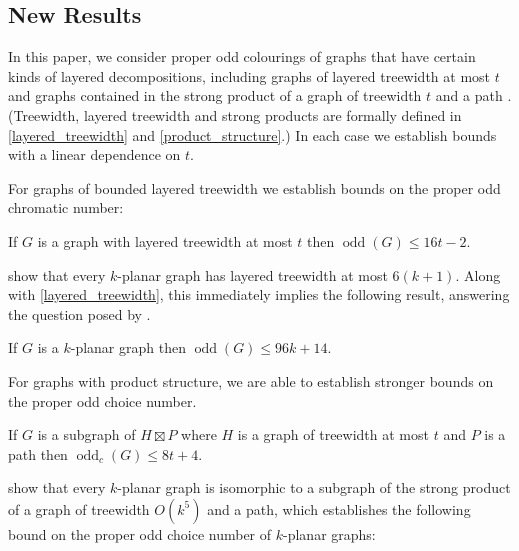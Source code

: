\documentclass{patmorin}
\DeclareMathOperator{\odd}{odd}
\newcommand{\oddc}{\odd_c}
\begin{document}
\subsection{New Results}

In this paper, we consider proper odd colourings of graphs that have certain kinds of layered decompositions, including graphs of layered treewidth at most $t$ \cite{dujmovic.morin.ea:layered} and graphs contained in the strong product of a graph of treewidth $t$ and a path \cite{dujmovic.joret.ea:planar}.  (Treewidth, layered treewidth and strong products are formally defined in \cref{layered_treewidth} and \cref{product_structure}.)  
In each case we establish bounds with a linear dependence on $t$.  

For graphs of bounded layered treewidth we establish bounds on the proper odd chromatic number:

\begin{thm}\label{layered_treewidth_result}
  If $G$ is a graph with layered treewidth at most $t$ then $\odd(G)\le 16t-2$.
\end{thm}

\citet[Theorem 10]{dujmovic.eppstein.ea:genus} show that every $k$-planar graph has layered treewidth at most $6(k+1)$.  Along with \cref{layered_treewidth}, this immediately implies the following result, answering the question posed by \citet{cranston.lafferty.ea:note}.

\begin{cor}\label{k_planar}
  If $G$ is a $k$-planar graph then $\odd(G)\le 96k+14$.
\end{cor}

For graphs with product structure, we are able to establish stronger bounds on the proper odd choice number.

\begin{thm}\label{product_structure_result}
  If $G$ is a subgraph of $H\boxtimes P$ where $H$ is a graph of treewidth at most $t$ and $P$ is a path then $\oddc(G)\le 8t+4$.
\end{thm}

\citet[Theorem 2]{dujmovic.morin.ea:structure} show that every $k$-planar graph is isomorphic to a subgraph of the strong product of a graph of treewidth $O(k^5)$ and a path, which establishes the following bound on the proper odd choice number of $k$-planar graphs:
\end{document}
